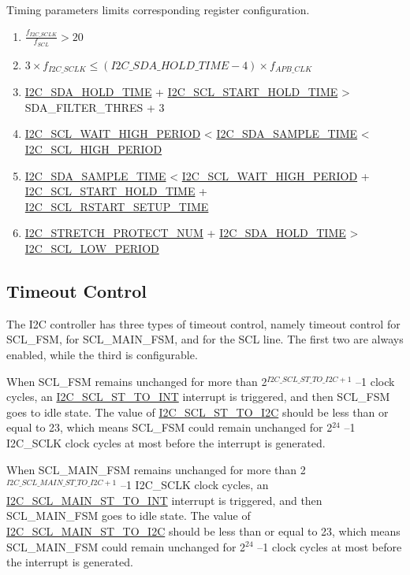 \documentclass[main\_\_EN.tex]{subfiles}
\begin{document}
Timing parameters limits corresponding register configuration.
\begin{enumerate}
\item $\frac{f_{I2C\_SCLK}}{f_{SCL}}  > 20$
\item $3 \times f_{I2C\_SCLK} \leq (\hyperref[fielddesc:I2CSDAHOLDTIME]{I2C\_SDA\_HOLD\_TIME}-4) \times f_{APB\_CLK}$
\item \hyperref[fielddesc:I2CSDAHOLDTIME]{I2C\_SDA\_HOLD\_TIME} + \hyperref[fielddesc:I2CSCLSTARTHOLDTIME]{I2C\_SCL\_START\_HOLD\_TIME} > SDA\_FILTER\_THRES + 3
\item \hyperref[fielddesc:I2CSCLWAITHIGHPERIOD]{I2C\_SCL\_WAIT\_HIGH\_PERIOD} < \hyperref[fielddesc:I2CSDASAMPLETIME]{I2C\_SDA\_SAMPLE\_TIME} < \hyperref[fielddesc:I2CSCLHIGHPERIOD]{I2C\_SCL\_HIGH\_PERIOD}
\item \hyperref[fielddesc:I2CSDASAMPLETIME]{I2C\_SDA\_SAMPLE\_TIME} < \hyperref[fielddesc:I2CSCLWAITHIGHPERIOD]{I2C\_SCL\_WAIT\_HIGH\_PERIOD} + \hyperref[fielddesc:I2CSCLSTARTHOLDTIME]{I2C\_SCL\_START\_HOLD\_TIME} + \\\hyperref[fielddesc:I2CSCLRSTARTSETUPTIME]{I2C\_SCL\_RSTART\_SETUP\_TIME}
\item \hyperref[fielddesc:I2CSTRETCHPROTECTNUM]{I2C\_STRETCH\_PROTECT\_NUM} + \hyperref[fielddesc:I2CSDAHOLDTIME]{I2C\_SDA\_HOLD\_TIME} > \hyperref[fielddesc:I2CSCLLOWPERIOD]{I2C\_SCL\_LOW\_PERIOD}
\end{enumerate}



\subsection{Timeout Control}
The I2C controller has three types of timeout control, namely timeout control for SCL\_FSM, for SCL\_MAIN\_FSM, and for the SCL line. The first two are always enabled, while the third is configurable.

When SCL\_FSM remains unchanged for more than 2$^{\hyperref[fielddesc:I2CSCLSTTOI2C]{I2C\_SCL\_ST\_TO\_I2C}+1}$ –1 clock cycles, an \hyperref[int:i2c-scl-fsm]{I2C\_SCL\_ST\_TO\_INT} interrupt is triggered, and then SCL\_FSM goes to idle state. The value of \hyperref[fielddesc:I2CSCLSTTOI2C]{I2C\_SCL\_ST\_TO\_I2C} should be less than or equal to 23, which means SCL\_FSM could remain unchanged for 2$^{24}$ –1 I2C\_SCLK clock cycles at most before the interrupt is generated.

When SCL\_MAIN\_FSM remains unchanged for more than 2$^{ \hyperref[fielddesc:I2CSCLMAINSTTOI2C]{I2C\_SCL\_MAIN\_ST\_TO\_I2C}+1}$ –1 I2C\_SCLK clock cycles, an \hyperref[int:i2c-scl-main-fsm]{I2C\_SCL\_MAIN\_ST\_TO\_INT} interrupt is triggered, and then SCL\_MAIN\_FSM goes to idle state. The value of \hyperref[fielddesc:I2CSCLMAINSTTOI2C]{I2C\_SCL\_MAIN\_ST\_TO\_I2C} should be less than or equal to 23, which means SCL\_MAIN\_FSM could remain unchanged for 2$^{24}$ –1 clock cycles at most before the interrupt is generated.
\end{document}
